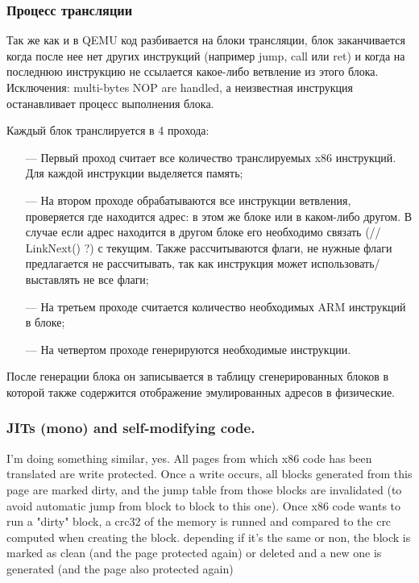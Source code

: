\subsubsection{Процесс трансляции}

Так же как и в QEMU код разбивается на блоки трансляции, блок заканчивается когда после нее нет других инструкций (например jump, call или ret) и когда на последнюю инструкцию не ссылается какое-либо ветвление из этого блока. Исключения: multi-bytes NOP are handled, а неизвестная инструкция останавливает процесс выполнения блока.

Каждый блок транслируется в 4 прохода:
\begin{itemize}[leftmargin=1.6\parindent]
	\item[---] Первый проход считает все количество транслируемых x86 инструкций. Для каждой инструкции выделяется память;
	\item[---] На втором проходе обрабатываются все инструкции ветвления, проверяется где находится адрес: в этом же блоке или в каком-либо другом. В случае если адрес находится в другом блоке его необходимо связать (// LinkNext() ?) с текущим. Также рассчитываются флаги, не нужные флаги предлагается не рассчитывать, так как инструкция может использовать/выставлять не все флаги;
	\item[---] На третьем проходе считается количество необходимых ARM инструкций в блоке;
	\item[---] На четвертом проходе генерируются необходимые инструкции.
\end{itemize}

После генерации блока он записывается в таблицу сгенерированных блоков в которой также содержится отображение эмулированных адресов в физические. \cite{box64_wide}

\subsubsection{JITs (mono) and self-modifying code.}

I'm doing something similar, yes. All pages from which x86 code has been translated are write protected. Once a write occurs, all blocks generated from this page are marked dirty, and the jump table from those blocks are invalidated (to avoid automatic jump from block to block to this one). Once x86 code wants to run a "dirty" block, a crc32 of the memory is runned and compared to the crc computed when creating the block. depending if it's the same or non, the block is marked as clean (and the page protected again) or deleted and a new one is generated (and the page also protected again)

